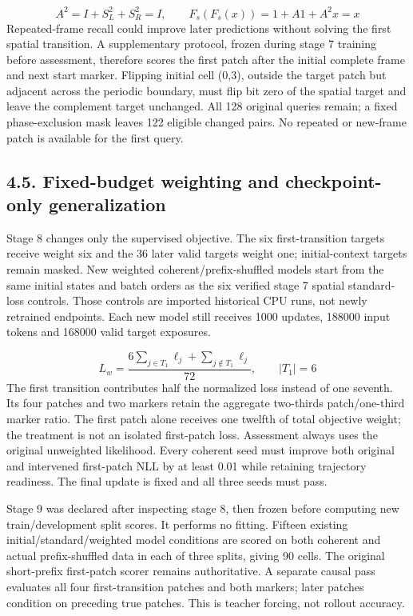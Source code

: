 \documentclass[11pt,a4paper]{article}
\begin{document}
\begin{equation}
A^2=I+S_L^2+S_R^2=I,\qquad F_s(F_s(x))=1+A1+A^2x=x
\end{equation}
Repeated-frame recall could improve later predictions without solving the first spatial transition. A supplementary protocol, frozen during stage 7 training before assessment, therefore scores the first patch after the initial complete frame and next start marker. Flipping initial cell (0,3), outside the target patch but adjacent across the periodic boundary, must flip bit zero of the spatial target and leave the complement target unchanged. All 128 original queries remain; a fixed phase-exclusion mask leaves 122 eligible changed pairs. No repeated or new-frame patch is available for the first query.

\subsection*{4.5. Fixed-budget weighting and checkpoint-only generalization}
Stage 8 changes only the supervised objective. The six first-transition targets receive weight six and the 36 later valid targets weight one; initial-context targets remain masked. New weighted coherent/\allowbreak{}prefix-shuffled models start from the same initial states and batch orders as the six verified stage 7 spatial standard-loss controls. Those controls are imported historical CPU runs, not newly retrained endpoints. Each new model still receives 1000 updates, 188000 input tokens and 168000 valid target exposures.

\begin{equation}
L_w=\frac{6\sum_{j\in T_1}\ell_j+\sum_{j\notin T_1}\ell_j}{72},\qquad |T_1|=6
\end{equation}
The first transition contributes half the normalized loss instead of one seventh. Its four patches and two markers retain the aggregate two-thirds patch/\allowbreak{}one-third marker ratio. The first patch alone receives one twelfth of total objective weight; the treatment is not an isolated first-patch loss. Assessment always uses the original unweighted likelihood. Every coherent seed must improve both original and intervened first-patch NLL by at least 0.01 while retaining trajectory readiness. The final update is fixed and all three seeds must pass.

Stage 9 was declared after inspecting stage 8, then frozen before computing new train/\allowbreak{}development split scores. It performs no fitting. Fifteen existing initial/\allowbreak{}standard/\allowbreak{}weighted model conditions are scored on both coherent and actual prefix-shuffled data in each of three splits, giving 90 cells. The original short-prefix first-patch scorer remains authoritative. A separate causal pass evaluates all four first-transition patches and both markers; later patches condition on preceding true patches. This is teacher forcing, not rollout accuracy.
\end{document}
